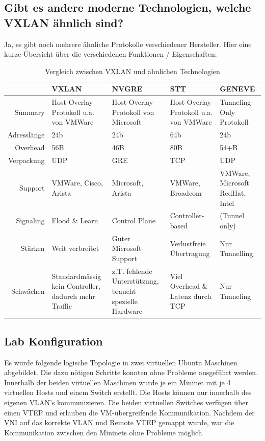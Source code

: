 \subsection{Gibt es andere moderne Technologien, welche VXLAN ähnlich sind?}

Ja, es gibt noch mehrere ähnliche Protokolle verschiedener Hersteller. Hier eine kurze Übersicht über die verschiedenen Funktionen / Eigenschaften:

\begin{table}[h]
	\centering
	\begin{tabu} to \linewidth {r X X X X}
		\toprule
		& VXLAN & NVGRE & STT & GENEVE \\
		\midrule
		Summary
			& Host-Overlay Protokoll u.a. von VMWare
			& Host-Overlay Protokoll von Microsoft
			& Host-Overlay Protokoll u.a. von VMWare
			& Tunneling-Only Protokoll \\
		Adresslänge & 24b & 24b & 64b & 24b \\
		Overhead & 56B & 46B & 80B & 54+B \\
		Verpackung & UDP & GRE & TCP & UDP \\
		Support & VMWare, Cisco, Arista & Microsoft, Arista & VMWare, Broadcom & VMWare, Microsoft RedHat, Intel \\
		Signaling & Flood \& Learn & Control Plane & Controller-based & (Tunnel only) \\
		Stärken & Weit verbreitet & Guter Microsoft-Support & Verlustfreie Übertragung & Nur Tunnelling \\
		Schwächen & Standardmässig kein Controller, dadurch mehr Traffic & z.T. fehlende Unterstützung, braucht spezielle Hardware & Viel Overhead \& Latenz durch TCP & Nur Tunneling \\
		\bottomrule
	\end{tabu}
	\label{tbl:VXLANcompare}
	\caption{Vergleich zwischen VXLAN und ähnlichen Technologien}
\end{table}


\subsection{Lab Konfiguration}
Es wurde folgende logische Topologie in zwei virtuellen Ubuntu Maschinen abgebildet. Die dazu nötigen Schritte konnten ohne Probleme ausgeführt werden. Innerhalb der beiden virtuellen Maschinen wurde je ein Mininet mit je 4 virtuellen Hosts und einem Switch erstellt. Die Hosts können nur innerhalb des eigenen VLAN's kommunizieren. Die beiden virtuellen Switches verfügen über einen VTEP und erlauben die VM-übergreifende Kommunikation. Nachdem der VNI auf das korrekte VLAN und Remote VTEP gemappt wurde, war die Kommunikation zwischen den Mininets ohne Probleme möglich.

